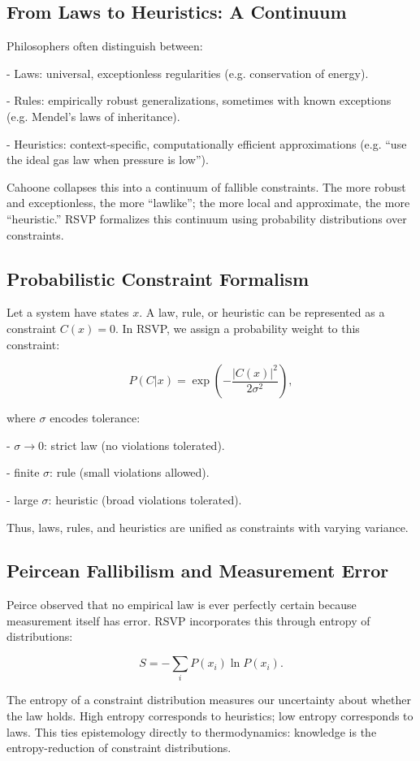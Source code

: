 \documentclass[12pt]{book}
\begin{document}
\subsection{From Laws to Heuristics: A Continuum}
Philosophers often distinguish between:

- Laws: universal, exceptionless regularities (e.g. conservation of energy).

- Rules: empirically robust generalizations, sometimes with known exceptions (e.g. Mendel’s laws of inheritance).

- Heuristics: context-specific, computationally efficient approximations (e.g. “use the ideal gas law when pressure is low”).

Cahoone collapses this into a continuum of fallible constraints. The more robust and exceptionless, the more “lawlike”; the more local and approximate, the more “heuristic.” RSVP formalizes this continuum using probability distributions over constraints.

\subsection{Probabilistic Constraint Formalism}
Let a system have states \( x \). A law, rule, or heuristic can be represented as a constraint \( C(x) = 0 \). In RSVP, we assign a probability weight to this constraint:

\[ P(C | x) = \exp\!\left(-\frac{|C(x)|^2}{2\sigma^2}\right), \]

where \( \sigma \) encodes tolerance:

- \( \sigma \to 0 \): strict law (no violations tolerated).

- finite \( \sigma \): rule (small violations allowed).

- large \( \sigma \): heuristic (broad violations tolerated).

Thus, laws, rules, and heuristics are unified as constraints with varying variance.

\subsection{Peircean Fallibilism and Measurement Error}
Peirce observed that no empirical law is ever perfectly certain because measurement itself has error. RSVP incorporates this through entropy of distributions:

\[ S = -\sum_i P(x_i) \ln P(x_i). \]

The entropy of a constraint distribution measures our uncertainty about whether the law holds. High entropy corresponds to heuristics; low entropy corresponds to laws. This ties epistemology directly to thermodynamics: knowledge is the entropy-reduction of constraint distributions.
\end{document}
